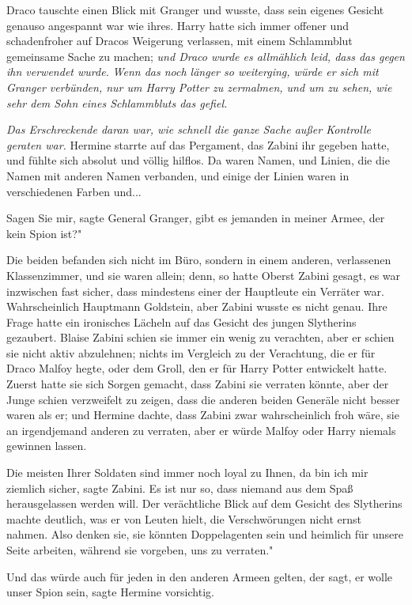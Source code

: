 Draco tauschte einen Blick mit Granger und wusste, dass sein eigenes Gesicht
genauso angespannt war wie ihres. Harry hatte sich immer offener und
schadenfroher auf Dracos Weigerung verlassen, mit einem Schlammblut gemeinsame
Sache zu machen; \emph{und Draco wurde es allmählich leid, dass das gegen ihn
verwendet wurde.}
\emph{ }
\emph{Wenn das noch länger so weiterging, würde er sich mit Granger verbünden, nur um Harry Potter zu zermalmen, und um zu sehen, wie sehr dem Sohn eines Schlammbluts das gefiel.}


\emph{Das Erschreckende daran war, wie schnell die ganze Sache außer Kontrolle geraten war.}
Hermine starrte auf das Pergament, das Zabini ihr gegeben hatte, und fühlte sich
absolut und völlig hilflos. Da waren Namen, und Linien, die die Namen mit
anderen Namen verbanden, und einige der Linien waren in verschiedenen Farben
und...

\glqq Sagen Sie mir\grqq{}, sagte General Granger, \glqq gibt es jemanden in
meiner Armee, der kein Spion ist?"

Die beiden befanden sich nicht im Büro, sondern in einem anderen, verlassenen
Klassenzimmer, und sie waren allein; denn, so hatte Oberst Zabini gesagt, es war
inzwischen fast sicher, dass mindestens einer der Hauptleute ein Verräter war.
Wahrscheinlich Hauptmann Goldstein, aber Zabini wusste es nicht genau. Ihre
Frage hatte ein ironisches Lächeln auf das Gesicht des jungen Slytherins
gezaubert. Blaise Zabini schien sie immer ein wenig zu verachten, aber er schien
sie nicht aktiv abzulehnen; nichts im Vergleich zu der Verachtung, die er für
Draco Malfoy hegte, oder dem Groll, den er für Harry Potter entwickelt hatte.
Zuerst hatte sie sich Sorgen gemacht, dass Zabini sie verraten könnte, aber der
Junge schien verzweifelt zu zeigen, dass die anderen beiden Generäle nicht
besser waren als er; und Hermine dachte, dass Zabini zwar wahrscheinlich froh
wäre, sie an irgendjemand anderen zu verraten, aber er würde Malfoy oder Harry
niemals gewinnen lassen.

\glqq Die meisten Ihrer Soldaten sind immer noch loyal zu Ihnen, da bin ich mir
ziemlich sicher\grqq{}, sagte Zabini. \glqq Es ist nur so, dass niemand aus dem
Spaß herausgelassen werden will.\grqq{} Der verächtliche Blick auf dem Gesicht
des Slytherins machte deutlich, was er von Leuten hielt, die Verschwörungen
nicht ernst nahmen. \glqq Also denken sie, sie könnten Doppelagenten sein und
heimlich für unsere Seite arbeiten, während sie vorgeben, uns zu verraten."

\glqq Und das würde auch für jeden in den anderen Armeen gelten, der sagt, er
wolle unser Spion sein\grqq{}, sagte Hermine vorsichtig.

